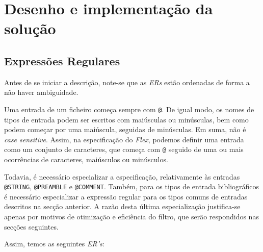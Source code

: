 \section{Desenho e implementação da solução}
\label{sec:des:a}

\subsection{Expressões Regulares}
Antes de se iniciar a descrição, note-se que as \emph{ERs} estão ordenadas de
forma a não haver ambiguidade.


Uma entrada de um ficheiro  começa sempre com \texttt{@}. De
igual modo, os nomes de tipos de entrada podem ser escritos com maiúsculas ou
minúsculas, bem como podem começar por uma maiúscula, seguidas de minúsculas. Em
suma, não é \emph{case sensitive}. Assim, na especificação do \emph{Flex},
podemos definir uma entrada como um conjunto de caracteres, que começa com
\texttt{@} seguido de uma ou mais ocorrências de caracteres, maiúsculos ou
minúsculos.

Todavia, é necessário especializar a especificação, relativamente às entradas
\texttt{@STRING}, \texttt{@PREAMBLE} e \texttt{@COMMENT}. Também, para os tipos
de entrada bibliográficos é necessário especializar a expressão regular para os
tipos comuns de entradas descritos na secção anterior. A razão desta última
especialização justifica-se apenas por motivos de otimização e eficiência do
filtro, que serão respondidos nas secções seguintes. 

Assim, temos as seguintes \emph{ER's}:

